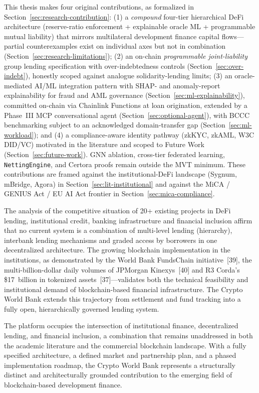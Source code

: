 \documentclass[12pt,a4paper]{report}
\begin{document}
This thesis makes four original contributions, as formalized in Section~\ref{sec:research-contribution}: (1) a \textit{compound} four-tier hierarchical DeFi architecture (reserve-ratio enforcement + explainable oracle ML + programmable mutual liability) that mirrors multilateral development finance capital flows---partial counterexamples exist on individual axes but not in combination (Section~\ref{sec:research-limitations}); (2) an on-chain \textit{programmable joint-liability} group lending specification with over-indebtedness controls (Section~\ref{sec:over-indebt}), honestly scoped against analogue solidarity-lending limits; (3) an oracle-mediated AI/ML integration pattern with SHAP- and anomaly-report explainability for fraud and AML governance (Section~\ref{sec:ml-explainability}), committed on-chain via Chainlink Functions at loan origination, extended by a Phase~III MCP conversational agent (Section~\ref{sec:optional-agent}), with BCCC benchmarking subject to an acknowledged domain-transfer gap (Section~\ref{sec:ml-workload}); and (4) a compliance-aware identity pathway (zkKYC, zkAML, W3C DID/VC) motivated in the literature and scoped to Future Work (Section~\ref{sec:future-work}). GNN ablation, cross-tier federated learning, \texttt{NettingEngine}, and Certora proofs remain outside the MVT minimum. These contributions are framed against the institutional-DeFi landscape (Sygnum, mBridge, Agora) in Section~\ref{sec:lit-institutional} and against the MiCA / GENIUS Act / EU AI Act frontier in Section~\ref{sec:mica-compliance}.

The analysis of the competitive situation of 20+ existing projects in DeFi lending, institutional credit, banking infrastructure and financial inclusion affirm that no current system is a combination of multi-level lending (hierarchy), interbank lending mechanisms and graded access by borrowers in one decentralized architecture. The growing blockchain implementation in the institutions, as demonstrated by the World Bank FundsChain initiative~[39], the multi-billion-dollar daily volumes of JPMorgan Kinexys~[40] and R3 Corda's \$17~billion in tokenized assets~[37]---validates both the technical feasibility and institutional demand of blockchain-based financial infrastructure. The Crypto World Bank extends this trajectory from settlement and fund tracking into a fully open, hierarchically governed lending system.

The platform occupies the intersection of institutional finance, decentralized lending, and financial inclusion, a combination that remains unaddressed in both the academic literature and the commercial blockchain landscape. With a fully specified architecture, a defined market and partnership plan, and a phased implementation roadmap, the Crypto World Bank represents a structurally distinct and architecturally grounded contribution to the emerging field of blockchain-based development finance.
\end{document}
